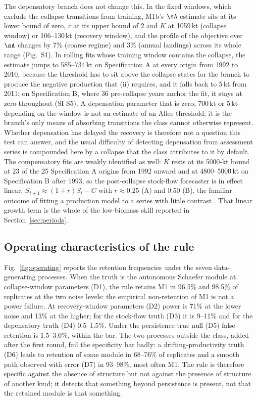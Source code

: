 The depensatory branch does not change this. In the fixed windows, which exclude the collapse transitions from training, M1b's $\sA$ estimate sits at its lower bound of zero, $r$ at its upper bound of 2 and $K$ at 1059\,kt (collapse window) or 106--130\,kt (recovery window), and the profile of the objective over $\sA$ changes by 7\% (coarse regime) and 3\% (annual landings) across its whole range (Fig.~S1). In rolling fits whose training window contains the collapse, the estimate jumps to 585--734\,kt on Specification A at every origin from 1992 to 2010, because the threshold has to sit above the collapse states for the branch to produce the negative production that (ii) requires, and it falls back to 5\,kt from 2011; on Specification B, where 36 pre-collapse years anchor the fit, it stays at zero throughout (SI S5). A depensation parameter that is zero, 700\,kt or 5\,kt depending on the window is not an estimate of an Allee threshold; it is the branch's only means of absorbing transitions the class cannot otherwise represent. Whether depensation has delayed the recovery \citep{Shelton1999,Hutchings1996,Rose2026} is therefore not a question this test can answer, and the usual difficulty of detecting depensation from assessment series \citep{Myers1995,Liermann1997} is compounded here by a collapse that the class attributes to it by default. The compensatory fits are weakly identified as well: $K$ rests at its 5000-kt bound at 23 of the 25 Specification A origins from 1992 onward and at 4800--5000\,kt on Specification B after 1993, so the post-collapse stock-flow forecaster is in effect linear, $S_{t+1}\approx(1+r)S_t - C$ with $r\approx 0.25$ (A) and $0.50$ (B), the familiar outcome of fitting a production model to a series with little contrast \citep{HilbornWalters1992,LudwigWalters1985,Polacheck1993}. That linear growth term is the whole of the low-biomass skill reported in Section~\ref{sec:periods}.

\FloatBarrier
\subsection{Operating characteristics of the rule}\label{sec:operating}

Fig.~\ref{fig:operating} reports the retention frequencies under the seven data-generating processes. When the truth is the autonomous Schaefer module at collapse-window parameters (D1), the rule retains M1 in 96.5\% and 98.5\% of replicates at the two noise levels: the empirical non-retention of M1 is not a power failure. At recovery-window parameters (D2) power is 71\% at the lower noise and 13\% at the higher; for the stock-flow truth (D3) it is 9--11\% and for the depensatory truth (D4) 0.5--1.5\%. Under the persistence-true null (D5) false retention is 1.5--3.0\%, within the bar. The two processes outside the class, added after the first round, fail the specificity bar badly: a drifting-productivity truth (D6) leads to retention of some module in 68--76\% of replicates and a smooth path observed with error (D7) in 93--98\%, most often M1. The rule is therefore specific against the absence of structure but not against the presence of structure of another kind; it detects that something beyond persistence is present, not that the retained module is that something.

